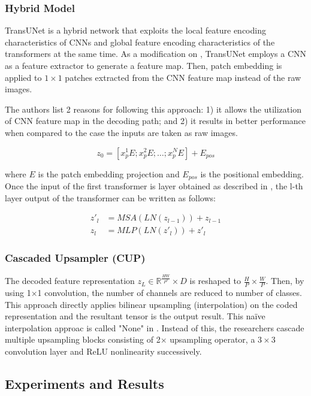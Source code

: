 \documentclass{IEEEtran}
\begin{document}
\subsubsection{Hybrid Model}
TransUNet is a hybrid network that exploits the local feature encoding characteristics of CNNs and global feature encoding characteristics of the transformers at the same time. As a modification on \cite{dosovitskiy2020image}, TransUNet employs a CNN as a feature extractor to generate a feature map. Then, patch embedding is applied to $1 \times 1$ patches extracted from the CNN feature map instead of the raw images. 

The authors list 2 reasons for following this approach: 1) it allows the utilization of CNN feature map in the decoding path; and 2) it results in better performance when compared to the case the inputs are taken as raw images. 

\begin{equation}
    z_0 = [x_p^1E; x_p^2E; \hdots; x_p^NE] + E_{pos}
    \label{eq:firstinput}
\end{equation}

where $E$ is the patch embedding projection and $E_{pos}$ is the positional embedding. 
Once the input of the first transformer is layer obtained as described in , the l-th layer output of the transformer can be written as follows: 

\begin{eqnarray}
    {z'}_l &= MSA(LN(z_{l-1})) + z_{l-1} \\
    z_l &= MLP(LN({z'}_l)) + {z'}_l
\end{eqnarray}
\vfill\null\newpage
\subsubsection{Cascaded Upsampler (CUP)}
The decoded feature representation $z_L \in \mathbb{R}^{\frac{HW}{P^2}} \times D$ is reshaped to $\frac{H}{P} \times \frac{W}{P}$. Then, by using 1$\times$1 convolution, the number of channels are reduced to number of classes. This approach directly applies bilinear upsampling (interpolation) on the coded representation and the resultant tensor is the output result. This na\"ive interpolation approac is called "None" in \cite{chen2021transunet}. Instead of this, the researchers cascade multiple upsampling blocks consisting of 2$\times$ upsampling operator, a $3\times 3$ convolution layer and ReLU nonlinearity successively. 

\subsection{Experiments and Results}
\end{document}
